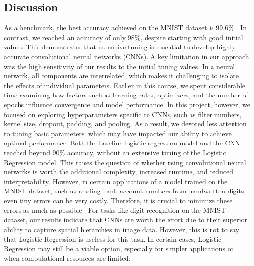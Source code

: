 \subsection{Discussion}
As a benchmark, the best accuracy achieved on the MNIST dataset is 99.6\% \cite{simard2003mnist}. In contrast, we reached an accuracy of only 98\%, despite starting with good initial values. This demonstrates that extensive tuning is essential to develop highly accurate convolutional neural networks (CNNs). A key limitation in our approach was the high sensitivity of our results to the initial tuning values. In a neural network, all components are interrelated, which makes it challenging to isolate the effects of individual parameters.
\newline
\newline
Earlier in this course, we spent considerable time examining how factors such as learning rates, optimizers, and the number of epochs influence convergence and model performance. In this project, however, we focused on exploring hyperparameters specific to CNNs, such as filter numbers, kernel size, dropout, padding, and pooling. As a result, we devoted less attention to tuning basic parameters, which may have impacted our ability to achieve optimal performance.
\newline
\newline
Both the baseline logistic regression model and the CNN reached beyond 90\% accuracy, without an extensive tuning of the Logistic Regression model. This raises the question of whether using convolutional neural networks is worth the additional complexity, increased runtime, and reduced interpretability. However, in certain applications of a model trained on the MNIST dataset, such as reading bank account numbers from handwritten digits, even tiny errors can be very costly. Therefore, it is crucial to minimize these errors as much as possible \cite{raschka2022machine}. 
\newline
\newline
For tasks like digit recognition on the MNIST dataset, our results indicate that CNNs are worth the effort due to their superior ability to capture spatial hierarchies in image data. However, this is not to say that Logistic Regression is useless for this task. In certain cases, Logistic Regression may still be a viable option, especially for simpler applications or when computational resources are limited. 
